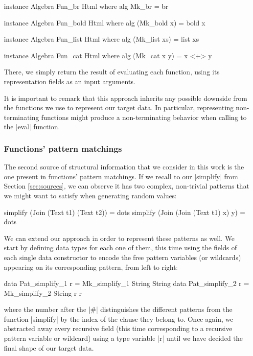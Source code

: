 \begin{code}
instance Algebra Fun_br Html where
  alg Mk_br = br

instance Algebra Fun_bold Html where
  alg (Mk_bold x) = bold x

instance Algebra Fun_list Html where
  alg (Mk_list xs) = list xs

instance Algebra Fun_cat Html where
  alg (Mk_cat x y) = x <+> y
\end{code}
%
There, we simply return the result of evaluating each function, using its
representation fields as an input arguments.


It is important to remark that this approach inherits any possible downside from
the functions we use to represent our target data.
%
In particular, representing non-terminating functions might produce a
non-terminating behavior when calling to the |eval| function.


%
%
\subsubsection{Functions' pattern matchings}

The second source of structural information that we consider in this work is the
one present in functions' pattern matchings.
%
If we recall to our |simplify| from Section \ref{sec:sources}, we can observe it
has two complex, non-trivial patterns that we might want to satisfy when
generating random values:

\begin{code}
simplify (Join (Text t1) (Text t2))   = dots
simplify (Join (Join (Text t1) x) y)  = dots
\end{code}
%
We can extend our approach in order to represent these patterns as well.
%
We start by defining data types for each one of them, this time using the fields
of each single data constructor to encode the free pattern variables (or
wildcards) appearing on its corresponding pattern, from left to right:

\begin{code}
data Pat_simplify_1 r = Mk_simplify_1 String String
data Pat_simplify_2 r = Mk_simplify_2 String r r
\end{code}
%
where the number after the |#| distinguishes the different patterns from the
function |simplify| by the index of the clause they belong to.
%
Once again, we abstracted away every recursive field (this time corresponding to
a recursive pattern variable or wildcard) using a type variable |r| until we
have decided the final shape of our target data.


